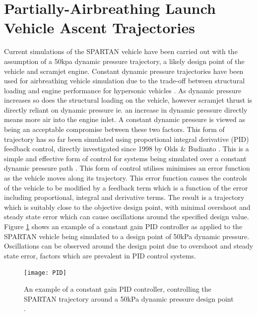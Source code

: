 \section{Partially-Airbreathing Launch Vehicle Ascent Trajectories}

Current simulations of the SPARTAN vehicle have been carried out with the assumption of a 50kpa dynamic pressure trajectory, a likely design point of the vehicle and scramjet engine. 
 Constant dynamic pressure trajectories have been used for airbreathing vehicle simulation due to the trade-off between structural loading and engine performance for hypersonic vehicles \cite{Olds1998} . As dynamic pressure increases so does the structural loading on the vehicle, however scramjet thrust is directly reliant on dynamic pressure ie. an increase in dynamic pressure directly means more air into the engine inlet. A constant dynamic pressure is viewed as being an acceptable compromise between these two factors.   
This form of trajectory has so far been simulated using proportional integral derivative (PID) feedback control, directly investigated since 1998 by Olds \& Budianto \cite{Olds1998}. This is a simple and effective form of control for systems being simulated over a constant dynamic pressure path \cite{Preller2015}. This form of control utilises minimises an error function as the vehicle moves along its trajectory. This error function causes the controls of the vehicle to be modified by a feedback term which is a function of the error including proportional, integral and derivative terms. The result is a trajectory which is suitably close to the objective design point, with minimal overshoot and steady state error which can cause oscillations around the specified design value. Figure \ref{fig:PID} shows an example of a constant gain PID controller as applied to the SPARTAN vehicle being simulated to a design point of 50kPa dynamic pressure. Oscillations can be observed around the design point due to overshoot and steady state error, factors which are prevalent in PID control systems.

\begin{figure}[ht]
	\centering
	\texttt{[image: PID]}
	\caption{An example of a constant gain PID controller, controlling the SPARTAN trajectory around a 50kPa dynamic pressure design point \cite{Preller2015}.}
	\label{fig:PID}
\end{figure}



